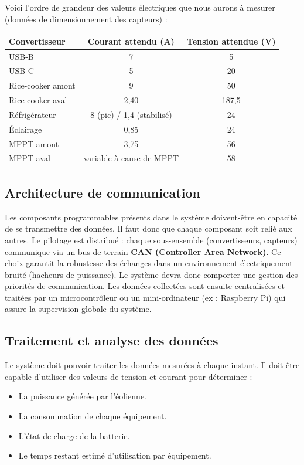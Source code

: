 Voici l'ordre de grandeur des valeurs électriques que nous aurons à mesurer (données de dimensionnement des capteurs) : 

\begin{tableau}[H]
    \centering
    \begin{tabularx}{\textwidth}{X c c}
        \toprule
        \textbf{Convertisseur} & \textbf{Courant attendu (A)} & \textbf{Tension attendue (V)} \\
        \midrule
        USB-B & 7 & 5 \\
        USB-C & 5 & 20 \\
        Rice-cooker amont & 9 & 50 \\
        Rice-cooker aval & 2,40 & 187,5 \\
        Réfrigérateur & 8 (pic) / 1,4 (stabilisé) & 24 \\
        Éclairage & 0,85 & 24 \\
        MPPT amont & 3,75 & 56 \\
        MPPT aval & variable à cause de MPPT & 58 \\
        \bottomrule
    \end{tabularx}
    \caption{Ordres de grandeur des mesures pour le monitoring.}
    \label{tab:monitoring_values_detailed}
\end{tableau}

\subsection{Architecture de communication}
Les composants programmables présents dans le système doivent-être en capacité de se transmettre des données. Il faut donc que chaque composant soit relié aux autres. Le pilotage est distribué : chaque sous-ensemble (convertisseurs, capteurs) communique via un bus de terrain \textbf{CAN (Controller Area Network)}. Ce choix garantit la robustesse des échanges dans un environnement électriquement bruité (hacheurs de puissance). Le système devra donc comporter une gestion des priorités de communication. Les données collectées sont ensuite centralisées et traitées par un microcontrôleur ou un mini-ordinateur (ex : Raspberry Pi) qui assure la supervision globale du système.

\subsection{Traitement et analyse des données}
Le système doit pouvoir traiter les données mesurées à chaque instant. Il doit être capable d’utiliser des valeurs de tension et courant pour déterminer : 
\begin{itemize}
    \item La puissance générée par l’éolienne.
    \item La consommation de chaque équipement.
    \item L’état de charge de la batterie.
    \item Le temps restant estimé d’utilisation par équipement.
\end{itemize}

